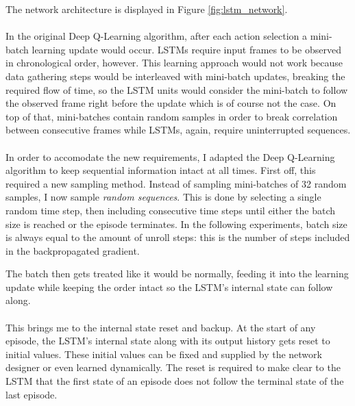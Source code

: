 The network architecture is displayed in Figure \ref{fig:lstm_network}.

\paragraph{}
In the original Deep Q-Learning algorithm,
after each action selection
a mini-batch learning update would occur.
LSTMs require input frames to be observed in chronological order, however.
This learning approach would not work
because data gathering steps would be interleaved with mini-batch updates,
breaking the required flow of time,
so the LSTM units
would consider the mini-batch to follow the observed frame right before the update
which is of course not the case.
On top of that, mini-batches contain random samples
in order to break correlation
between consecutive frames
while LSTMs, again, require uninterrupted sequences.

\paragraph{}
In order to accomodate the new requirements,
I adapted the Deep Q-Learning algorithm
to keep sequential information intact at all times.
First off,
this required a new sampling method.
Instead of sampling mini-batches of 32 random samples,
I now sample \textit{random sequences}.
This is done by selecting a single random time step,
then including consecutive time steps
until either the batch size
is reached or the episode terminates.
In the following experiments,
batch size is always equal to
the amount of unroll steps:
this is the number of steps included
in the backpropagated gradient.

The batch then gets treated like it would be normally,
feeding it into the learning update while keeping the order intact
so the LSTM's internal state can follow along.

\paragraph{}
This brings me to the internal state reset and backup.
At the start of any episode,
the LSTM's internal state along with its output history
gets reset to initial values.
These initial values can be fixed and supplied
by the network designer
or even learned dynamically.
The reset is required to make clear to the LSTM
that the first state of an episode
does not follow the terminal state of the last episode.

